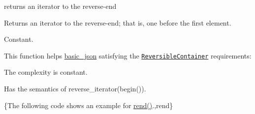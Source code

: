 returns an iterator to the reverse-\/end 

Returns an iterator to the reverse-\/end; that is, one before the first element.

  Constant.

This function helps {\ttfamily \hyperlink{classnlohmann_1_1basic__json}{basic\-\_\-json}} satisfying the \href{http://en.cppreference.com/w/cpp/concept/ReversibleContainer}{\tt Reversible\-Container} requirements\-:
\begin{DoxyItemize}
\item The complexity is constant.
\item Has the semantics of {\ttfamily reverse\-\_\-iterator(begin())}.
\end{DoxyItemize}

\{The following code shows an example for {\ttfamily \hyperlink{classnlohmann_1_1basic__json_aaa160a960dd3dd90856a72b1d8dbe707}{rend()}}.,rend\}

